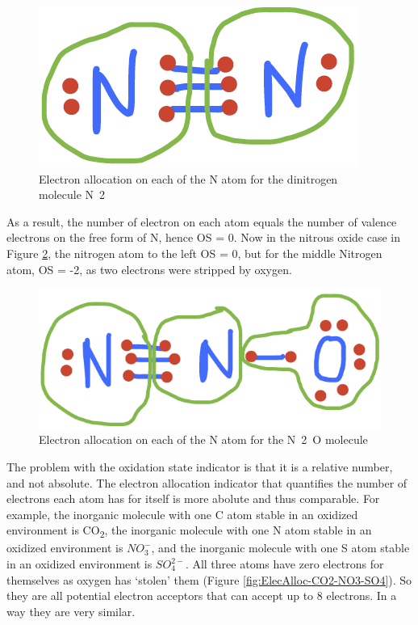 \documentclass[]{book}
\theoremstyle{definition}
\theoremstyle{definition}
\theoremstyle{definition}
\theoremstyle{remark}
\begin{document}
\begin{figure}

{\centering \includegraphics[width=0.2\linewidth]{pictures/ElecAlloc_N2} 

}

\caption{Electron allocation on each of the N atom for the dinitrogen molecule N~2~}\label{fig:ElecAlloc-N2}
\end{figure}

As a result, the number of electron on each atom equals the number of
valence electrons on the free form of N, hence OS = 0. Now in the
nitrous oxide case in Figure \ref{fig:ElecAlloc-N2O}, the nitrogen atom
to the left OS = 0, but for the middle Nitrogen atom, OS = -2, as two
electrons were stripped by oxygen.

\begin{figure}

{\centering \includegraphics[width=0.2\linewidth]{pictures/ElecAlloc_N2O} 

}

\caption{Electron allocation on each of the N atom for the N~2~O molecule}\label{fig:ElecAlloc-N2O}
\end{figure}

The problem with the oxidation state indicator is that it is a relative
number, and not absolute. The electron allocation indicator that
quantifies the number of electrons each atom has for itself is more
abolute and thus comparable. For example, the inorganic molecule with
one C atom stable in an oxidized environment is CO\textsubscript{2}, the
inorganic molecule with one N atom stable in an oxidized environment is
\(NO_3^-\), and the inorganic molecule with one S atom stable in an
oxidized environment is \(SO_4^{2-}\). All three atoms have zero
electrons for themselves as oxygen has `stolen' them (Figure
\ref{fig:ElecAlloc-CO2-NO3-SO4}). So they are all potential electron
acceptors that can accept up to 8 electrons. In a way they are very
similar.
\end{document}
